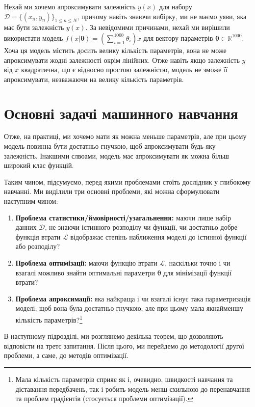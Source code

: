 \begin{example}
	Нехай ми хочемо апроксимувати залежність $y(x)$ для набору $\mathcal{D} =
	\{(x_n,y_n)\}_{1 \leq n \leq N}$, причому навіть знаючи вибірку, ми не маємо
	уяви, яка має бути залежність $y(x)$. За невідомими причинами, нехай ми
	вирішили використати модель $f(x|\boldsymbol{\theta}) =
	\left(\sum_{i=1}^{1000}\theta_i\right)x$ для вектору параметрів
	$\boldsymbol{\theta} \in \mathbb{R}^{1000}$. Хоча ця модель містить досить
	велику кількість параметрів, вона не може апроксимувати жодні залежності
	окрім лінійних. Отже навіть якщо залежність $y$ від $x$ квадратична, що
	є відносно простою залежністю, модель не зможе її апроксимувати, незважаючи 
	на велику кількість параметрів.
\end{example}

\section{Основні задачі машинного навчання}

Отже, на практиці, ми хочемо мати як можна меньше параметрів, але при цьому 
модель повинна бути достатньо гнучкою, щоб апроксимувати будь-яку залежність. 
Інакшими слвоами, модель має апроксимувати як можна більш широкий клас 
функцій. 

Таким чином, підсумуємо, перед якими проблемами стоїть дослідник у глибокому
навчанні. Ми виділили три основні проблеми, які можна сформулювати наступним
чином: 
\begin{enumerate}
	\item \textbf{Проблема статистики/ймовірності/узагальнення:} маючи лише
	набір данних $\mathcal{D}$, не знаючи істинного розподілу чи функції, чи
	достатньо добре функція втрати $\mathcal{L}$ відображає степінь наближення
	моделі до істинної функції або розподілу?
	\item \textbf{Проблема оптимізації:} маючи функцію втрати $\mathcal{L}$,
	наскільки точно і чи взагалі можливо знайти оптимальні параметри
	$\boldsymbol{\theta}$ для мінімізації функції втрати?
	\item \textbf{Проблема апроксимації:} яка найкраща і чи взагалі існує така
	параметризація моделі, щоб вона була достатньо гнучкою, але при цьому мала
	якнайменшу кількість параметрів?\footnote{Мала кількість параметрів сприяє
	як і, очевидно, швидкості навчання та діставання передбачень, так і робить
	модель менш схильною до перенавчання та проблем градієнтів (стосується
	проблеми оптимізації).}
\end{enumerate}

В наступному підрозділі, ми розглянемо декілька теорем, що 
дозволяють відповісти на третє запитання. Після цього, ми перейдемо 
до методології другої проблеми, а саме, до методів оптимізації.
